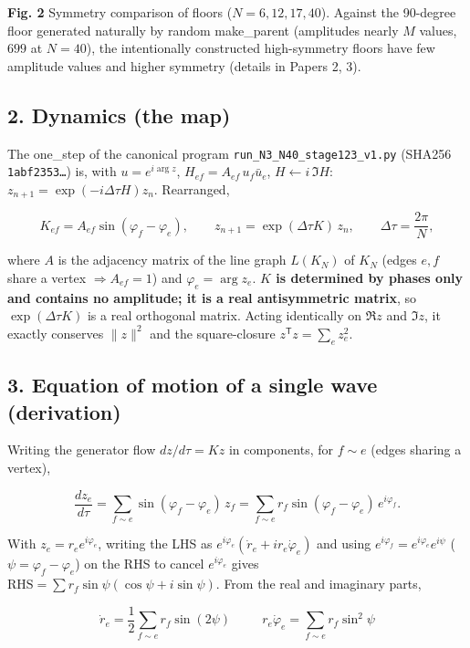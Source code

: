 \documentclass[
  a4paper,
]{ltjsarticle}
\begin{document}
\textbf{Fig. 2} Symmetry comparison of floors (\(N=6,12,17,40\)).
Against the 90-degree floor generated naturally by random make\_parent
(amplitudes nearly \(M\) values, \(699\) at \(N=40\)), the intentionally
constructed high-symmetry floors have few amplitude values and higher
symmetry (details in Papers 2, 3).

\subsection{2. Dynamics (the map)}\label{dynamics-the-map}

The one\_step of the canonical program
\texttt{run\_N3\_N40\_stage123\_v1.py} (SHA256 \texttt{1abf2353…}) is,
with \(u=e^{i\arg z}\), \(H_{ef}=A_{ef}\,u_f\bar u_e\),
\(H\leftarrow i\,\Im H\): \(z_{n+1}=\exp(-i\Delta\tau H)z_n\).
Rearranged,

\[K_{ef}=A_{ef}\sin(\varphi_f-\varphi_e),\qquad z_{n+1}=\exp(\Delta\tau K)\,z_n,\qquad \Delta\tau=\frac{2\pi}{N},\]

where \(A\) is the adjacency matrix of the line graph \(L(K_N)\) of
\(K_N\) (edges \(e,f\) share a vertex \(\Rightarrow A_{ef}=1\)) and
\(\varphi_e=\arg z_e\). \textbf{\(K\) is determined by phases only and
contains no amplitude; it is a real antisymmetric matrix}, so
\(\exp(\Delta\tau K)\) is a real orthogonal matrix. Acting identically
on \(\Re z\) and \(\Im z\), it exactly conserves \(\|z\|^2\) and the
square-closure \(z^{\mathsf T}z=\sum_e z_e^2\).

\subsection{3. Equation of motion of a single wave
(derivation)}\label{equation-of-motion-of-a-single-wave-derivation}

Writing the generator flow \(dz/d\tau=Kz\) in components, for
\(f\sim e\) (edges sharing a vertex),

\[\frac{dz_e}{d\tau}=\sum_{f\sim e}\sin(\varphi_f-\varphi_e)\,z_f=\sum_{f\sim e}r_f\sin(\varphi_f-\varphi_e)\,e^{i\varphi_f}.\]

With \(z_e=r_e e^{i\varphi_e}\), writing the LHS as
\(e^{i\varphi_e}(\dot r_e+ir_e\dot\varphi_e)\) and using
\(e^{i\varphi_f}=e^{i\varphi_e}e^{i\psi}\)
(\(\psi=\varphi_f-\varphi_e\)) on the RHS to cancel \(e^{i\varphi_e}\)
gives \(\text{RHS}=\sum r_f\sin\psi(\cos\psi+i\sin\psi)\). From the real
and imaginary parts,

\[\boxed{\ \dot r_e=\frac12\sum_{f\sim e}r_f\sin(2\psi)\ }\qquad\boxed{\ r_e\dot\varphi_e=\sum_{f\sim e}r_f\sin^2\psi\ }\]
\end{document}
